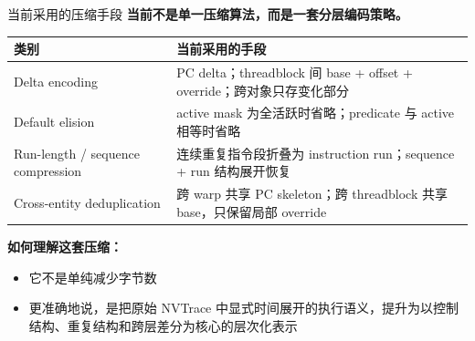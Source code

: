 \documentclass[aspectratio=169]{beamer}
\begin{document}
\begin{frame}{当前采用的压缩手段}
\textbf{当前不是单一压缩算法，而是一套分层编码策略。}

\vspace{0.6em}
\begin{table}
\small
\begin{tabular}{>{\raggedright\arraybackslash}p{} >{\raggedright\arraybackslash}p{}}
\toprule
\textbf{类别} & \textbf{当前采用的手段} \\
\midrule
Delta encoding & PC delta；threadblock 间 base + offset + override；跨对象只存变化部分 \\
\addlinespace
Default elision & active mask 为全活跃时省略；predicate 与 active 相等时省略 \\
\addlinespace
Run-length / sequence compression & 连续重复指令段折叠为 instruction run；sequence + run 结构展开恢复 \\
\addlinespace
Cross-entity deduplication & 跨 warp 共享 PC skeleton；跨 threadblock 共享 base，只保留局部 override \\
\bottomrule
\end{tabular}
\end{table}

\vspace{0.6em}
\textbf{如何理解这套压缩：}
\begin{itemize}
  \item 它不是单纯减少字节数
  \item 更准确地说，是把原始 NVTrace 中显式时间展开的执行语义，提升为以控制结构、重复结构和跨层差分为核心的层次化表示
\end{itemize}
\end{frame}
\end{document}
